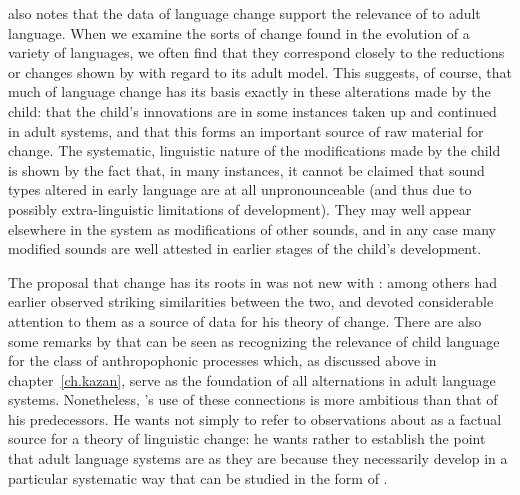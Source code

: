 {\Jakobson} also notes that the data of language change support the
relevance of  to adult language. When we examine the
sorts of change found in the evolution of a variety of languages, we
often find that they correspond closely to the reductions or changes
shown by  with regard to its adult model. This suggests,
of course, that much of language change has its basis exactly in these
alterations made by the child: that the child's innovations are in
some instances taken up and continued in adult systems, and that this
forms an important source of raw material for change. The systematic,
linguistic nature of the modifications made by the child is shown by
the fact that, in many instances, it cannot be claimed that sound
types altered in early language are at all unpronounceable (and thus
due to possibly extra-linguistic limitations of development). They may
well appear elsewhere in the system as modifications of other sounds,
and in any case many modified sounds are well attested in earlier
stages of the child's development.

The proposal that change has its roots in  was not new
with {\Jakobson}: \citet{grammont02:child.language,grammont33:traite}
among others had earlier observed striking similarities between the
two, and devoted considerable attention to them as a source of data
for his theory of change. There are also some remarks by {\DeCourtenay}
that can be seen as recognizing the relevance of child
language for the class of anthropophonic processes which, as discussed
above in chapter~\ref{ch.kazan}, serve as the foundation of all
alternations in adult language systems. Nonetheless, {\Jakobson}'s use of
these connections is more ambitious than that of his predecessors. He
wants not simply to refer to observations about  as a
factual source for a theory of linguistic change: he wants rather to
establish the point that adult language systems are as they are
because they necessarily develop in a particular systematic way that
can be studied in the form of .

